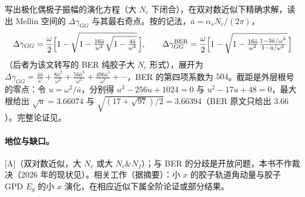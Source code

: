 \begin{proofsketch}
写出极化偶极子振幅的演化方程（大 $N_c$ 下闭合），在双对数近似下精确求解，读出 Mellin 空间的 $\Delta\gamma_{GG}$ 与其最右奇点。按\cite{Borden:2023ugd}的记法，$\bar a=\alpha_sN_c/(2\pi)$，
\begin{equation}\label{eq:front-dgamma}
\Delta\gamma_{GG}=\frac\omega2\Bigl[1-\sqrt{1-\tfrac{16\bar a}{\omega^2}\sqrt{1-\tfrac{4\bar a}{\omega^2}}}\,\Bigr],\qquad
\Delta\gamma_{GG}^{\rm BER}=\frac\omega2\Bigl[1-\sqrt{1-\tfrac{16\bar a}{\omega^2}\tfrac{1-3\bar a/\omega^2}{1-\bar a/\omega^2}}\,\Bigr]
\end{equation}
（后者为该文转写的 BER 纯胶子大 $N_c$ 形式），展开为 $\Delta\gamma_{GG}=\frac{4\bar a}\omega+\frac{8\bar a^2}{\omega^3}+\frac{56\bar a^3}{\omega^5}+\frac{496\bar a^4}{\omega^7}+\cdots$，BER 的第四项系数为 $504$。截距是外层根号的零点：令 $u=\omega^2/\bar a$，分别得 $u^3-256u+1024=0$ 与 $u^2-17u+48=0$，最大根给出 $\sqrt u=3.66074$ 与 $\sqrt{(17+\sqrt{97})/2}=3.66394$（BER 原文只给出 $3.66$）。完整论证见\cite{Borden:2023ugd,Borden:2025ehe}。
\end{proofsketch}

\paragraph{地位与缺口。}[A]（双对数近似，大 $N_c$ 或大 $N_c\&N_f$）；与 BER 的分歧是开放问题，本书不作裁决（2026 年的现状见\cite{Borden:2025ehe}）。相关工作（据摘要）：小 $x$ 的胶子轨道角动量\cite{Hatta:2016aoc}与胶子 GPD $E_g$ 的小 $x$ 演化\cite{Hatta:2022bxn}，在相应近似下属全阶论证或部分结果。
